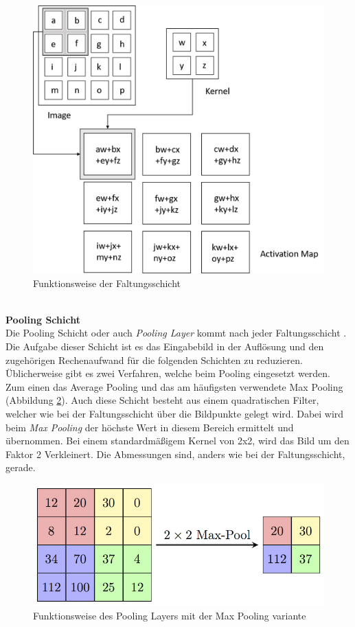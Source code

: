 \documentclass[a4paper,12pt,oneside]{article}
\begin{document}
\begin{figure}
	[h]
	\centering
	\includegraphics[scale=0.4]{Sources/CNN.png}
	\caption{Funktionsweise der Faltungsschicht \cite{convolutional2019layer}}
	\label{img:faltungsschicht}
\end{figure}\\
\textbf{Pooling Schicht}\\
Die Pooling Schicht oder auch \textit{Pooling Layer} kommt nach jeder Faltungsschicht \cite[336f.]{goodfellow2016deep}. Die Aufgabe dieser Schicht ist es das Eingabebild in der Auflösung und den zugehörigen Rechenaufwand für die folgenden Schichten zu reduzieren. Üblicherweise gibt es zwei Verfahren, welche beim Pooling eingesetzt werden. Zum einen das Average Pooling und das am häufigsten verwendete Max Pooling (Abbildung \ref{img:maxpooling}). Auch diese Schicht besteht aus einem quadratischen Filter, welcher wie bei der Faltungsschicht über die Bildpunkte gelegt wird. Dabei wird beim \textit{Max Pooling} der höchste Wert in diesem Bereich ermittelt und übernommen. Bei einem standardmäßigem Kernel von 2x2, wird das Bild um den Faktor 2 Verkleinert. Die Abmessungen sind, anders wie bei der Faltungsschicht, gerade.\\
\begin{figure}
	[h]
	\centering
	\includegraphics[scale=1.8]{Sources/MaxpoolSample2.png}
	\caption{Funktionsweise des Pooling Layers mit der Max Pooling variante \cite{pooling2018layer}}
	\label{img:maxpooling}
\end{figure}\\
\end{document}
